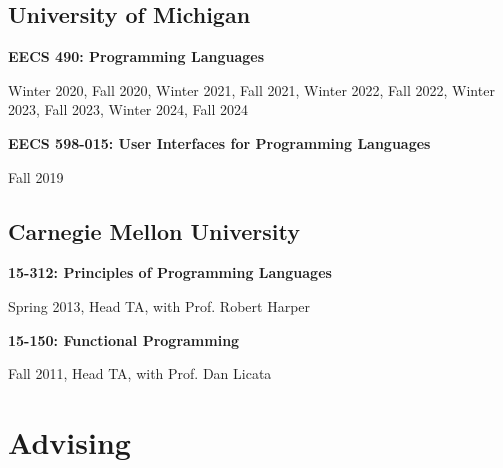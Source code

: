 \documentclass[10pt,letterpaper]{article}
\renewenvironment{itemize}{
  \begin{list}{}{
    \setlength{\leftmargin}{1.25em}
    \setlength{\itemsep}{0.25em}
    \setlength{\parskip}{0pt}
    \setlength{\parsep}{0.2em}
  }
}{
  \end{list}
}
\begin{document}
\subsection*{University of Michigan}
\begin{itemize}
  \item \textbf{EECS 490: Programming Languages}
        \begin{itemize}
          \item Winter 2020, Fall 2020, Winter 2021, Fall 2021, Winter 2022, Fall 2022, Winter 2023, Fall 2023, Winter 2024, Fall 2024
        \end{itemize}
  \item \textbf{EECS 598-015: User Interfaces for Programming Languages}
        \begin{itemize}
          \item Fall 2019
        \end{itemize}
\end{itemize}

\subsection*{Carnegie Mellon University}
\begin{itemize}
  \item \textbf{15-312: Principles of Programming Languages}
        \begin{itemize}
          \item Spring 2013, Head TA, with Prof. Robert Harper
        \end{itemize}
  \item \textbf{15-150: Functional Programming}
        \begin{itemize}
          \item Fall 2011, Head TA, with Prof. Dan Licata
        \end{itemize}
\end{itemize}


\section*{Advising}
\end{document}
